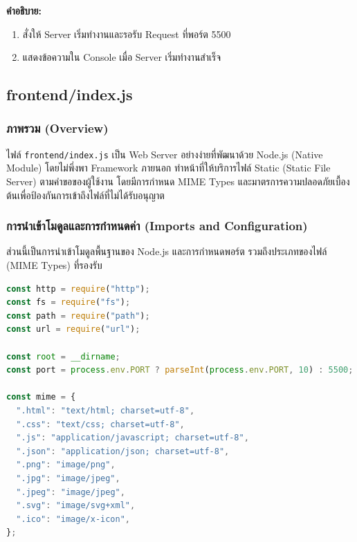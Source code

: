 \textbf{คำอธิบาย:}
\begin{enumerate}
    \item สั่งให้ Server เริ่มทำงานและรอรับ Request ที่พอร์ต 5500
    \item แสดงข้อความใน Console เมื่อ Server เริ่มทำงานสำเร็จ
\end{enumerate}


\subsection{frontend/index.js}

\subsubsection{ภาพรวม (Overview)}
ไฟล์ \texttt{frontend/index.js} เป็น Web Server อย่างง่ายที่พัฒนาด้วย Node.js (Native Module) โดยไม่พึ่งพา Framework ภายนอก ทำหน้าที่ให้บริการไฟล์ Static (Static File Server) ตามคำขอของผู้ใช้งาน โดยมีการกำหนด MIME Types และมาตรการความปลอดภัยเบื้องต้นเพื่อป้องกันการเข้าถึงไฟล์ที่ไม่ได้รับอนุญาต

\subsubsection{การนำเข้าโมดูลและการกำหนดค่า (Imports and Configuration)}
ส่วนนี้เป็นการนำเข้าโมดูลพื้นฐานของ Node.js และการกำหนดพอร์ต รวมถึงประเภทของไฟล์ (MIME Types) ที่รองรับ

\begin{lstlisting}[language=JavaScript, caption={การตั้งค่า Server และ MIME Types ใน frontend/index.js}, label={code:frontend-index-setup}]
const http = require("http");
const fs = require("fs");
const path = require("path");
const url = require("url");

const root = __dirname;
const port = process.env.PORT ? parseInt(process.env.PORT, 10) : 5500;

const mime = {
  ".html": "text/html; charset=utf-8",
  ".css": "text/css; charset=utf-8",
  ".js": "application/javascript; charset=utf-8",
  ".json": "application/json; charset=utf-8",
  ".png": "image/png",
  ".jpg": "image/jpeg",
  ".jpeg": "image/jpeg",
  ".svg": "image/svg+xml",
  ".ico": "image/x-icon",
};
\end{lstlisting}

